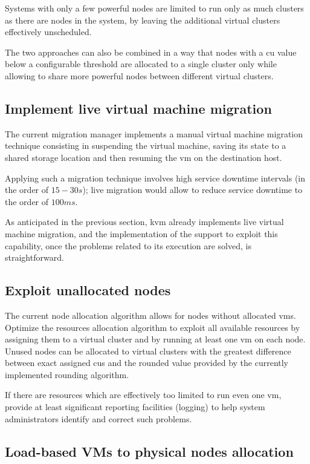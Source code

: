 Systems with only a few powerful nodes are limited to run only as much clusters as there are nodes in the system, by leaving the additional virtual clusters effectively unscheduled.

The two approaches can also be combined in a way that nodes with a \gls{cu} value below a configurable threshold are allocated to a single cluster only while allowing to share more powerful nodes between different virtual clusters.


\subsection{Implement live virtual machine migration}

The current migration manager implements a manual virtual machine migration technique consisting in suspending the virtual machine, saving its state to a shared storage location and then resuming the \gls{vm} on the destination host.

Applying such a migration technique involves high service downtime intervals (in the order of $15-30s$); live migration would allow to reduce service downtime to the order of $100ms$.

As anticipated in the previous section, \gls{kvm} already implements live virtual machine migration, and the implementation of the support to exploit this capability, once the problems related to its execution are solved, is straightforward.


\subsection{Exploit unallocated nodes}

The current node allocation algorithm allows for nodes without allocated \glspl{vm}. Optimize the resources allocation algorithm to exploit all available resources by assigning them to a virtual cluster and by running at least one \gls{vm} on each node. Unused nodes can be allocated to virtual clusters with the greatest difference between exact assigned \glspl{cu} and the rounded value provided by the currently implemented rounding algorithm.

If there are resources which are effectively too limited to run even one \gls{vm}, provide at least significant reporting facilities (logging) to help system administrators identify and correct such problems.


\subsection{Load-based VMs to physical nodes allocation}


